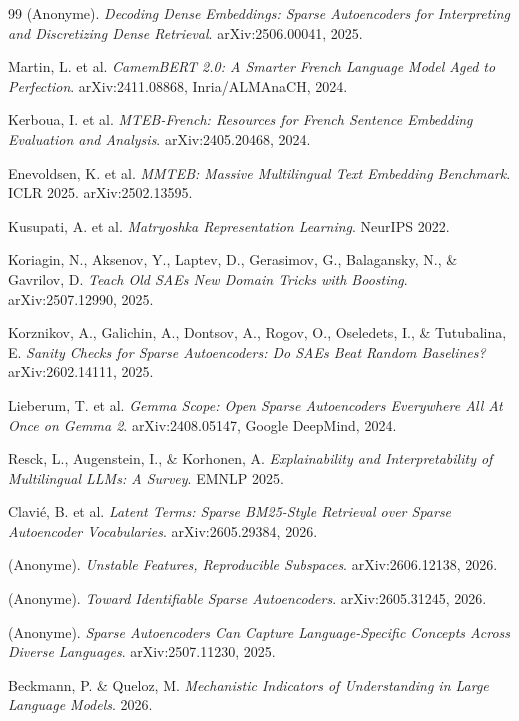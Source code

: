 \documentclass[11pt]{article}
\begin{document}
\begin{thebibliography}{99}
  (Anonyme).
  \textit{Decoding Dense Embeddings: Sparse Autoencoders for Interpreting and Discretizing Dense Retrieval}.
  arXiv:2506.00041, 2025.

  Martin, L. et al.
  \textit{CamemBERT 2.0: A Smarter French Language Model Aged to Perfection}.
  arXiv:2411.08868, Inria/ALMAnaCH, 2024.

  Kerboua, I. et al.
  \textit{MTEB-French: Resources for French Sentence Embedding Evaluation and Analysis}.
  arXiv:2405.20468, 2024.

  Enevoldsen, K. et al.
  \textit{MMTEB: Massive Multilingual Text Embedding Benchmark}.
  ICLR 2025. arXiv:2502.13595.

  Kusupati, A. et al.
  \textit{Matryoshka Representation Learning}.
  NeurIPS 2022.

  Koriagin, N., Aksenov, Y., Laptev, D., Gerasimov, G., Balagansky, N., \& Gavrilov, D.
  \textit{Teach Old SAEs New Domain Tricks with Boosting}.
  arXiv:2507.12990, 2025.

  Korznikov, A., Galichin, A., Dontsov, A., Rogov, O., Oseledets, I., \& Tutubalina, E.
  \textit{Sanity Checks for Sparse Autoencoders: Do SAEs Beat Random Baselines?}
  arXiv:2602.14111, 2025.

  Lieberum, T. et al.
  \textit{Gemma Scope: Open Sparse Autoencoders Everywhere All At Once on Gemma 2}.
  arXiv:2408.05147, Google DeepMind, 2024.

  Resck, L., Augenstein, I., \& Korhonen, A.
  \textit{Explainability and Interpretability of Multilingual LLMs: A Survey}.
  EMNLP 2025.

  Clavié, B. et al.
  \textit{Latent Terms: Sparse BM25-Style Retrieval over Sparse Autoencoder Vocabularies}.
  arXiv:2605.29384, 2026.

  (Anonyme).
  \textit{Unstable Features, Reproducible Subspaces}.
  arXiv:2606.12138, 2026.

  (Anonyme).
  \textit{Toward Identifiable Sparse Autoencoders}.
  arXiv:2605.31245, 2026.

  (Anonyme).
  \textit{Sparse Autoencoders Can Capture Language-Specific Concepts Across Diverse Languages}.
  arXiv:2507.11230, 2025.

  Beckmann, P. \& Queloz, M.
  \textit{Mechanistic Indicators of Understanding in Large Language Models}.
  2026.

\end{thebibliography}
\end{document}
